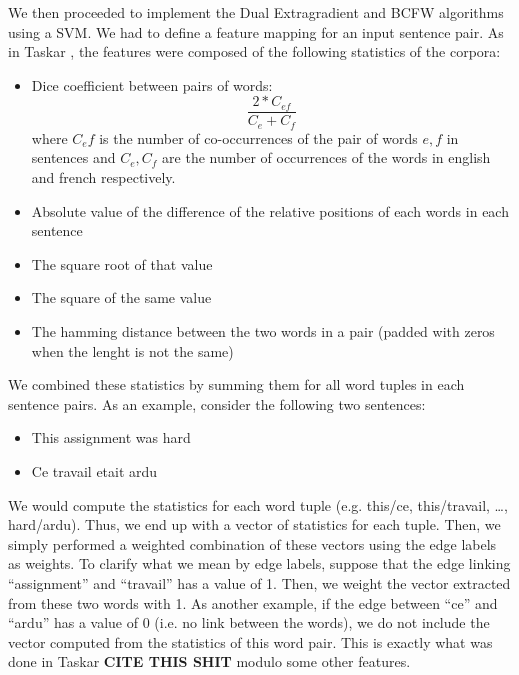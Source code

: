 We then proceeded to implement the Dual Extragradient and BCFW algorithms using
a SVM. We had to define a feature mapping for an input sentence pair. As in
Taskar \cite{taskarStructuredPredictionExtragradient}, the features were composed of the following
statistics of the corpora:
\begin{itemize}
  \item Dice coefficient between pairs of words:
    \begin{equation*}
      \frac{2*C_{ef}}{C_e + C_f}
    \end{equation*}
    where $C_ef$ is the number of co-occurrences of the pair of words $e,f$ in
sentences and $C_e, C_f$ are the number of occurrences of the words in english
and french respectively.

  \item Absolute value of the difference of the relative positions of each words in each sentence

  \item The square root of that value

  \item The square of the same value

  \item The hamming distance between the two words in a pair (padded with zeros when the lenght is not the same)

\end{itemize}
We combined these statistics by summing them for all word tuples in each sentence pairs. As an example, consider the following two sentences:
\begin{itemize}
  \item This assignment was hard
  \item Ce travail etait ardu
\end{itemize}
We would compute the statistics for each word tuple (e.g. this/ce, this/travail,
\dots, hard/ardu). Thus, we end up with a vector of statistics for each tuple.
Then, we simply performed a weighted combination of these vectors using the edge
labels as weights. To clarify what we mean by edge labels, suppose that the edge
linking ``assignment'' and ``travail'' has a value of 1. Then, we weight the
vector extracted from these two words with 1. As another example, if the edge
between ``ce'' and ``ardu'' has a value of 0 (i.e. no link between the words),
we do not include the vector computed from the statistics of this word pair.
This is exactly what was done in Taskar \textbf{CITE THIS SHIT} modulo some
other features.

